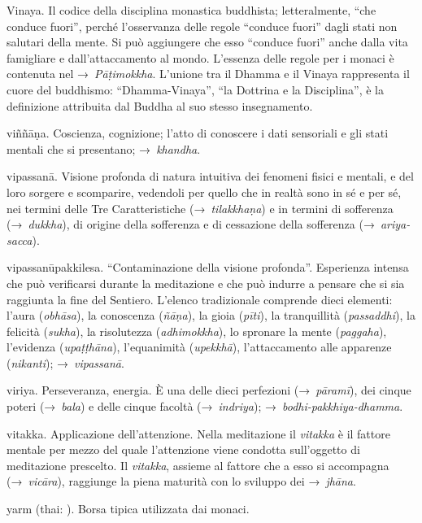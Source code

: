 \begin{glossarydescription}
\item[Vinaya.] Il codice della disciplina monastica buddhista;
  letteralmente, ``che conduce fuori'', perché l'osservanza delle regole
  ``conduce fuori'' dagli stati non salutari della mente. Si può aggiungere che
  esso ``conduce fuori'' anche dalla vita famigliare e dall'attaccamento al
  mondo. L'essenza delle regole per i monaci è contenuta nel
  →~\emph{Pāṭimokkha}. L'unione tra il Dhamma e il Vinaya rappresenta il cuore
  del buddhismo: ``Dhamma-Vinaya'', ``la Dottrina e la Disciplina'', è la
  definizione attribuita dal Buddha al suo stesso insegnamento.

\item[viññāṇa.] Coscienza, cognizione; l'atto di conoscere i dati
  sensoriali e gli stati mentali che si presentano; →~\emph{khandha}.

\item[vipassanā.] Visione profonda di natura intuitiva dei fenomeni fisici
  e mentali, e del loro sorgere e scomparire, vedendoli per quello che in realtà
  sono in sé e per sé, nei termini delle Tre Caratteristiche
  (→~\emph{tilakkhaṇa}) e in termini di sofferenza (→~\emph{dukkha}), di origine
  della sofferenza e di cessazione della sofferenza (→~\emph{ariya-sacca}).

\item[vipassanūpakkilesa.] ``Contaminazione della visione profonda''.
  Esperienza intensa che può verificarsi durante la meditazione e che può
  indurre a pensare che si sia raggiunta la fine del Sentiero. L'elenco
  tradizionale comprende dieci elementi: l'aura (\emph{obhāsa}), la conoscenza
  (\emph{ñāṇa}), la gioia (\emph{pīti}), la tranquillità (\emph{passaddhi}), la
  felicità (\emph{sukha}), la risolutezza (\emph{adhimokkha}), lo spronare la
  mente (\emph{paggaha}), l'evidenza (\emph{upaṭṭhāna}), l'equanimità
  (\emph{upekkhā}), l'attaccamento alle apparenze (\emph{nikanti});
  →~\emph{vipassanā}.

\item[viriya.] Perseveranza, energia. È una delle dieci perfezioni
  (→~\emph{pāramī}), dei cinque poteri (→~\emph{bala}) e delle cinque facoltà
  (→~\emph{indriya}); →~\emph{bodhi-pakkhiya-dhamma}.

\item[vitakka.] Applicazione dell'attenzione. Nella meditazione il
  \emph{vitakka} è il fattore mentale per mezzo del quale l'attenzione viene
  condotta sull'oggetto di meditazione prescelto. Il \emph{vitakka}, assieme al
  fattore che a esso si accompagna (→~\emph{vicāra}), raggiunge la piena
  maturità con lo sviluppo dei →~\emph{jhāna}.



\item[yarm] (thai: ). Borsa tipica utilizzata dai monaci.

\end{glossarydescription}

